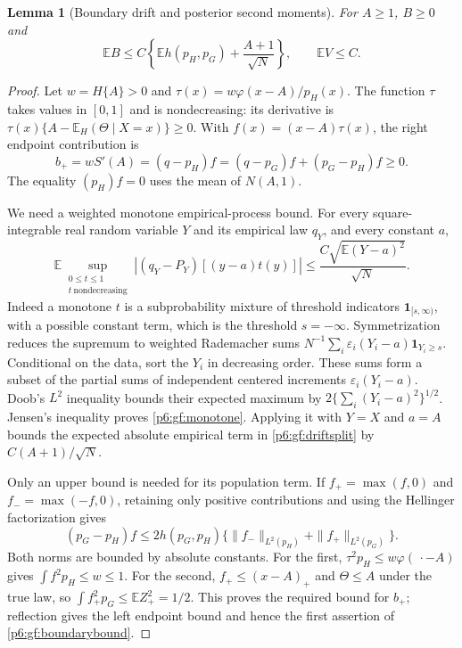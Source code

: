 \documentclass[11pt,a4paper]{article}
\newtheorem{lemma}[theorem]{Lemma}
\theoremstyle{definition}
\theoremstyle{remark}
\numberwithin{equation}{section}
\begin{document}
\begin{lemma}[Boundary drift and posterior second moments]\label{p6:gf:boundary}
For $A\ge1$, $B\ge0$ and
\begin{equation}\label{p6:gf:boundarybound}
 \mathbb E B\le C\left\{\mathbb E h(p_H,p_G)
                         +\frac{A+1}{\sqrt N}\right\},
                       \qquad \mathbb E V\le C.
\end{equation}
\end{lemma}
\begin{proof}
Let $w=H\{A\}>0$ and
$\tau(x)=w\varphi(x-A)/p_H(x)$.  The function $\tau$ takes values
in $[0,1]$ and is nondecreasing: its derivative is
$\tau(x)\{A-\mathbb E_H(\Theta\mid X=x)\}\ge0$.
With $f(x)=(x-A)\tau(x)$, the right endpoint contribution is
\begin{equation}\label{p6:gf:driftsplit}
 b_+=wS'(A)=(q-p_H)f=(q-p_G)f+(p_G-p_H)f\ge0.
\end{equation}
The equality $(p_H)f=0$ uses the mean of $N(A,1)$.

We need a weighted monotone empirical-process bound.  For every
square-integrable real random variable $Y$ and its empirical law
$q_Y$, and every constant $a$,
\begin{equation}\label{p6:gf:monotone}
 \mathbb E\sup_{\substack{0\le t\le1\\t\ \mathrm{nondecreasing}}}
       |(q_Y-P_Y)[(y-a)t(y)]|
       \le\frac{C\sqrt{\mathbb E(Y-a)^2}}{\sqrt N}.
\end{equation}
Indeed a monotone $t$ is a subprobability mixture of threshold
indicators $\mathbf1_{[s,\infty)}$, with a possible constant term,
which is the threshold $s=-\infty$.
Symmetrization reduces the supremum to weighted Rademacher sums
$N^{-1}\sum_i\varepsilon_i(Y_i-a)\mathbf1_{Y_i\ge s}$.
Conditional on the data, sort the $Y_i$ in decreasing order.
These sums form a subset of the partial sums of independent centered
increments $\varepsilon_i(Y_i-a)$.
Doob's $L^2$ inequality bounds their expected maximum by
$2\{\sum_i(Y_i-a)^2\}^{1/2}$.  Jensen's inequality proves
\eqref{p6:gf:monotone}.  Applying it with $Y=X$ and $a=A$ bounds the
expected absolute empirical term in \eqref{p6:gf:driftsplit} by
$C(A+1)/\sqrt N$.

Only an upper bound is needed for its population term.  If
$f_+=\max(f,0)$ and $f_-=\max(-f,0)$, retaining only positive
contributions and using the Hellinger factorization gives
\[
 (p_G-p_H)f\le2h(p_G,p_H)
       \{\|f_-\|_{L^2(p_H)}+\|f_+\|_{L^2(p_G)}\}.
\]
Both norms are bounded by absolute constants.
For the first, $\tau^2p_H\le w\varphi(\,\cdot-A)$ gives
$\int f^2p_H\le w\le1$.
For the second, $f_+\le(x-A)_+$ and $\Theta\le A$ under the true
law, so $\int f_+^2p_G\le\mathbb E Z_+^2=1/2$.
This proves the required bound for $b_+$; reflection gives the left
endpoint bound and hence the first assertion of \eqref{p6:gf:boundarybound}.


\end{proof}
\end{document}
